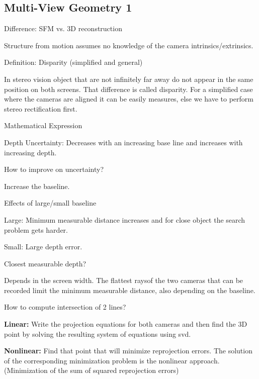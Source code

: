 \documentclass[10pt,a4paper]{scrartcl}
\begin{document}
\begin{multicols*}{2}
\subsection*{Multi-View Geometry 1}

\begin{QandA}
{Difference: SFM vs. 3D reconstruction}
\item Structure from motion assumes no knowledge of the camera intrinsics/extrinsics.
\end{QandA}
	
\begin{QandA}
{Definition:  Disparity (simplified and general)}
\item In stereo vision object that are not infinitely far away do not appear in the same position on both screens. That difference is called disparity. For a simplified case where the cameras are aligned it can be easily measures, else we have to perform stereo rectification first.
\item Mathematical Expression


\item Depth Uncertainty: Decreases with an increasing base line and increases with increasing depth.

\item How to improve on uncertainty?

Increase the baseline.
\end{QandA}

\begin{QandA}
{Effects of large/small baseline}
\item Large: Minimum measurable distance increases and for close object the search problem gets harder.
\item Small: Large depth error.
\end{QandA}

\begin{QandA}
{Closest measurable depth?}
\item Depends in the screen width. The \glqq flattest rays\grqq of the two cameras that can be recorded limit the minimum measurable distance, also depending on the baseline.
\end{QandA}

\begin{QandA}
{How to compute intersection of 2 lines?}
\item \textbf{Linear:} Write the projection equations for both cameras and then find the 3D point by solving the resulting system of equations using svd.
\item \textbf{Nonlinear:} Find that point that will minimize reprojection errors. The solution of the corresponding minimization problem is the nonlinear approach. (Minimization of the sum of squared reprojection errors)
\end{QandA}


\end{multicols*}
\end{document}
